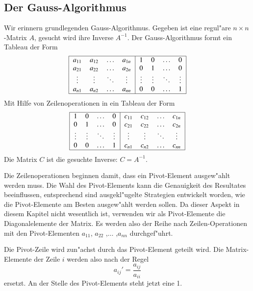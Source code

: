 \subsection{Der Gauss-Algorithmus}
Wir erinnern grundlegenden Gauss-Algorithmus. Gegeben ist eine regul"are
$n\times n$-Matrix $A$, gesucht wird ihre Inverse $A^{-1}$.
Der Gauss-Algorithmus formt ein Tableau der Form
\[
\begin{tabular}{|>{$}c<{$}>{$}c<{$}>{$}c<{$}>{$}c<{$}|>{$}c<{$}>{$}c<{$}>{$}c<{$}>{$}c<{$}|}
\hline
a_{11}&a_{12}&\dots &a_{1n}&1     &0     &\dots &0\\
a_{21}&a_{22}&\dots &a_{2n}&0     &1     &\dots &0\\
\vdots&\vdots&\ddots&\vdots&\vdots&\vdots&\ddots&\vdots\\
a_{n1}&a_{n2}&\dots &a_{nn}&0     &0     &\dots &1\\
\hline
\end{tabular}
\]
Mit Hilfe von Zeilenoperationen in ein Tableau der Form
\begin{equation}
\begin{tabular}{|>{$}c<{$}>{$}c<{$}>{$}c<{$}>{$}c<{$}|>{$}c<{$}>{$}c<{$}>{$}c<{$}>{$}c<{$}|}
\hline
1     &0     &\dots &0     & c_{11}&c_{12}&\dots &c_{1n}\\
0     &1     &\dots &0     & c_{21}&c_{22}&\dots &c_{2n}\\
\vdots&\vdots&\ddots&\vdots& \vdots&\vdots&\ddots&\vdots\\
0     &0     &\dots &1     & c_{n1}&c_{n2}&\dots &c_{nn}\\
\hline
\end{tabular}
\label{targettableau}
\end{equation}
Die Matrix $C$ ist die gesuchte Inverse: $C=A^{-1}$.

Die Zeilenoperationen beginnen damit, dass ein Pivot-Element ausgew"ahlt
werden muss.
Die Wahl des Pivot-Elements kann die Genauigkeit des Resultates beeinflussen,
entsprechend sind ausgekl"ugelte Strategien entwickelt worden, wie die
Pivot-Elemente am Besten ausgew"ahlt werden sollen. Da dieser Aspekt in
diesem Kapitel nicht wesentlich ist, verwenden wir als Pivot-Elemente die
Diagonalelemente der Matrix. Es werden also der Reihe nach Zeilen-Operationen
mit den Pivot-Elementen $a_{11}$, $a_{22}$ ,$\dots$ ,$a_{nn}$ 
durchgef"uhrt.

Die Pivot-Zeile wird zun"achst durch das
Pivot-Element geteilt wird. Die Matrix-Elemente der Zeile $i$ werden
also nach der Regel
\begin{equation}
a_{ij}'=\frac{a_{ij}}{a_{ii}}
\label{red}
\end{equation}
ersetzt.
An der Stelle des Pivot-Elements steht jetzt eine 1.

